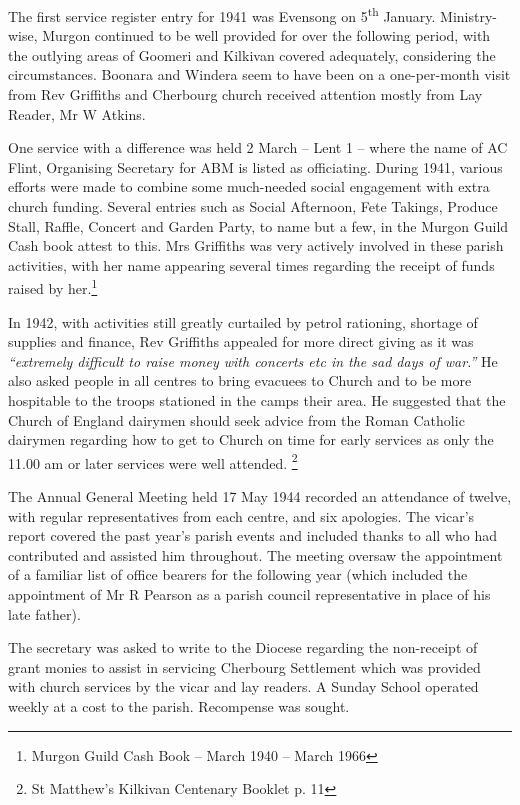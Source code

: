 The first service register entry for 1941 was Evensong on 5\textsuperscript{th} January. Ministry-wise, Murgon continued to be well provided for over the following period, with the outlying areas of Goomeri and Kilkivan covered adequately, considering the circumstances. Boonara and Windera seem to have been on a one-per-month visit from Rev Griffiths and Cherbourg church received attention mostly from Lay Reader, Mr W Atkins.

One service with a difference was held 2 March -- Lent 1 -- where the name of AC Flint, Organising Secretary for ABM is listed as officiating. During 1941, various efforts were made to combine some much-needed social engagement with extra church funding. Several entries such as Social Afternoon, Fete Takings, Produce Stall, Raffle, Concert and Garden Party, to name but a few, in the Murgon Guild Cash book attest to this. Mrs Griffiths was very actively involved in these parish activities, with her name appearing several times regarding the receipt of funds raised by her.\footnote{Murgon Guild Cash Book -- March 1940 -- March 1966}

In 1942, with activities still greatly curtailed by petrol rationing, shortage of supplies and finance, Rev Griffiths appealed for more direct giving as it was \emph{``extremely difficult to raise money with concerts etc in the sad days of war.''} He also asked people in all centres to bring evacuees to Church and to be more hospitable to the troops stationed in the camps their area. He suggested that the Church of England dairymen should seek advice from the Roman Catholic dairymen regarding how to get to Church on time for early services as only the 11.00 am or later services were well attended. \footnote{St Matthew's Kilkivan Centenary Booklet p. 11}

The Annual General Meeting held 17 May 1944 recorded an attendance of twelve, with regular representatives from each centre, and six apologies. The vicar's report covered the past year's parish events and included thanks to all who had contributed and assisted him throughout. The meeting oversaw the appointment of a familiar list of office bearers for the following year (which included the appointment of Mr R Pearson as a parish council representative in place of his late father).

The secretary was asked to write to the Diocese regarding the non-receipt of grant monies to assist in servicing Cherbourg Settlement which was provided with church services by the vicar and lay readers. A Sunday School operated weekly at a cost to the parish. Recompense was sought.

